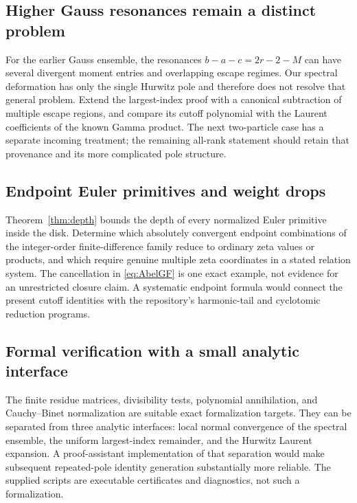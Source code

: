 \subsection{Higher Gauss resonances remain a distinct problem}
For the earlier Gauss ensemble, the resonances
$b-a-c=2r-2-M$ can have several divergent moment entries and overlapping
escape regimes. Our spectral deformation has only the single Hurwitz
pole and therefore does not resolve that general problem. Extend the
largest-index proof with a canonical subtraction of multiple escape
regions, and compare its cutoff polynomial with the Laurent coefficients
of the known Gamma product. The next two-particle case has a separate
incoming treatment; the remaining all-rank statement should retain that
provenance and its more complicated pole structure.

\subsection{Endpoint Euler primitives and weight drops}
Theorem~\ref{thm:depth} bounds the depth of every normalized Euler
primitive inside the disk. Determine which absolutely convergent endpoint
combinations of the integer-order finite-difference family reduce to
ordinary zeta values or products, and which require genuine multiple
zeta coordinates in a stated relation system. The cancellation in
\eqref{eq:AbelGF} is one exact example, not evidence for an unrestricted
closure claim. A systematic endpoint formula would connect the present
cutoff identities with the repository's harmonic-tail and cyclotomic
reduction programs.

\subsection{Formal verification with a small analytic interface}
The finite residue matrices, divisibility tests, polynomial annihilation,
and Cauchy--Binet normalization are suitable exact formalization targets.
They can be separated from three analytic interfaces: local normal
convergence of the spectral ensemble, the uniform largest-index remainder,
and the Hurwitz Laurent expansion. A proof-assistant implementation of
that separation would make subsequent repeated-pole identity generation
substantially more reliable. The supplied scripts are executable
certificates and diagnostics, not such a formalization.
